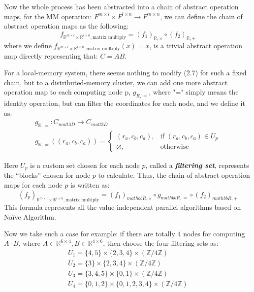 \documentclass{amsart}
\theoremstyle{definition}
\theoremstyle{remark}
\numberwithin{equation}{section}
\begin{document}
Now the whole process has been abstracted into a chain of abstract operation maps, for the MM  operation: $F^{m\times l}\times F^{l\times n}\to F^{m\times n}$, we can define the chain of abstract operation maps as the following:
\begin{equation}
f_{\mathbb{R}^{m\times l}\times\mathbb{R}^{l\times n},\text{matrix multiply}} = (f_1)_{\mathbb{R},\times}\circ(f_2)_{\mathbb{R},+}
\end{equation}
	where we define $f_{\mathbb{R}^{m\times l}\times\mathbb{R}^{l\times n},\text{matrix multiply}}(x)=x$, is a trivial abstract operation map directly representing that: $C=AB$.\par
	For a local-memory system, there seems nothing to modify (2.7) for such a fixed chain, but to a distributed-memory cluster, we can add one more abstract operation map to each computing node p, $g_{R,=}$, where "=" simply means the identity operation, but can filter the coordinates for each node, and we define it as:
\begin{equation}
\begin{array}{l}  
g_{\mathbb{R},=}:C_{mult3D}\to C_{mult3D}\\
g_{\mathbb{R},=}((r_a,c_b,c_a))=
	\left\{
	\begin{array}{ll}  
          (r_a,c_b,c_a), &\text{if } (r_a,c_b,c_a)\in U_p  \\ 
          \varnothing, &\text{otherwise}
	\end{array}
	\right.
\end{array}
\end{equation} 
\par
	Here $U_p$ is a custom set chosen for each node $p$, called a \emph{\textbf{filtering set}}, represents the “blocks” chosen for node $p$ to calculate. Thus, the chain of abstract operation maps for each node $p$ is written as:
\begin{equation}
(f_p)_{\mathbb{R}^{m\times l}\times\mathbb{R}^{l\times n},\text{matrix multiply}}=
(f_1)_{mathbb{R},\times}\circ g_{mathbb{R},=}\circ(f_2)_{mathbb{R},+}
\end{equation}
This formula represents all the value-independent parallel algorithms based on Naïve Algorithm.
\par
Now we take such a case for example: if there are totally 4 nodes for computing $A\cdot B$, where $A\in \mathbb{R}^{6\times4},B\in \mathbb{R}^{4\times6}$, then choose the four filtering sets as:
\begin{equation}
\begin{array}{l}  
      U_1=\{4,5\}\times\{2,3,4\}\times(\mathbb{Z}/4\mathbb{Z}) \\ U_2=\{3\}\times\{2,3,4\}\times(\mathbb{Z}/4\mathbb{Z})\\ 
      U_3=\{3,4,5\}\times\{0,1\}\times(\mathbb{Z}/4\mathbb{Z}) \\ U_4=\{0,1,2\}\times\{0,1,2,3,4\}\times(\mathbb{Z}/4\mathbb{Z}) 
\end{array}
\end{equation}
\end{document}
